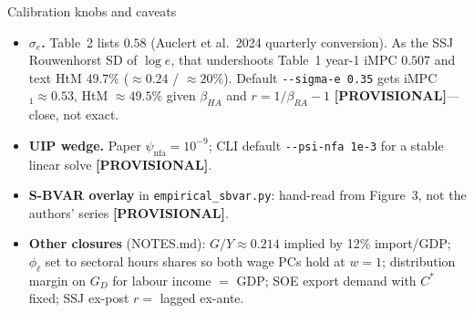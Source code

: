 \documentclass[11pt,aspectratio=169]{beamer}
\begin{document}
\begin{frame}{Calibration knobs and caveats}
  \begin{itemize}
    \item \textbf{$\sigma_e$.}
          Table~2 lists $0.58$ (Auclert et al.\ 2024 quarterly conversion).
          As the SSJ Rouwenhorst SD of $\log e$, that undershoots Table~1
          year-1 iMPC $0.507$ and text HtM $49.7\%$ ($\approx 0.24$ /
          $\approx 20\%$). Default \texttt{-{-}sigma-e 0.35} gets
          iMPC$_1\approx 0.53$, HtM $\approx 49.5\%$ given $\beta_{HA}$ and
          $r=1/\beta_{RA}-1$ \textbf{[PROVISIONAL]}---close, not exact.
    \item \textbf{UIP wedge.}
          Paper $\psi_{\mathrm{nfa}}=10^{-9}$; CLI default
          \texttt{-{-}psi-nfa 1e-3} for a stable linear solve
          \textbf{[PROVISIONAL]}.
    \item \textbf{S-BVAR overlay} in \texttt{empirical\_sbvar.py}: hand-read
          from Figure~3, not the authors' series \textbf{[PROVISIONAL]}.
    \item \textbf{Other closures} (NOTES.md): $G/Y\approx 0.214$ implied by
          12\% import/GDP; $\phi_{\ell}$ set to sectoral hours shares so both
          wage PCs hold at $w=1$; distribution margin on $G_D$ for labour
          income $=$ GDP; SOE export demand with $C^\ast$ fixed; SSJ
          ex-post $r=$ lagged ex-ante.
  \end{itemize}
\end{frame}

\end{document}
